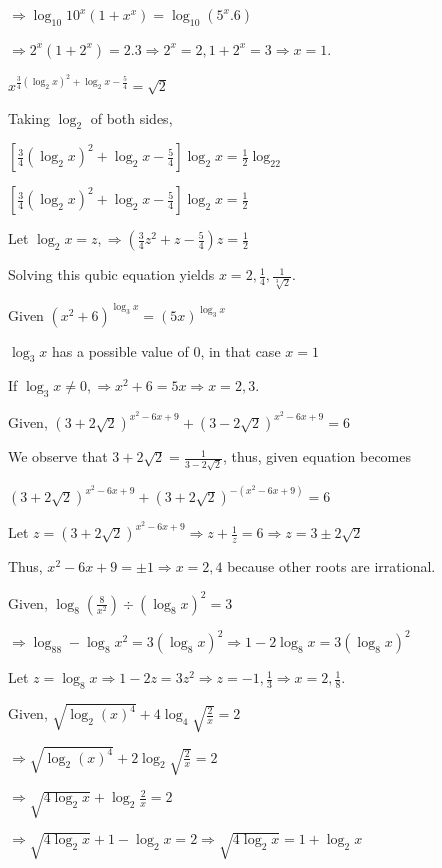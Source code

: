   $\Rightarrow \log_{10}10^x(1 + x^x) = \log_{10}(5^x.6)$

  $\Rightarrow 2^x(1 + 2^x) = 2.3 \Rightarrow 2^x = 2, 1 + 2^x = 3 \Rightarrow x = 1$.
\item $x^{\tfrac{3}{4}(\log_2x)^2 + \log_2x - \tfrac{5}{4}} = \sqrt{2}$

  Taking $\log_2$ of both sides,

  $\left[\frac{3}{4}(\log_2x)^2 + \log_2x - \frac{5}{4}\right]\log_2x = \frac{1}{2}\log_22$

  $\left[\frac{3}{4}(\log_2x)^2 + \log_2x - \frac{5}{4}\right]\log_2x = \frac{1}{2}$

  Let $\log_2x = z, \Rightarrow \left(\frac{3}{4}z^2 + z - \frac{5}{4}\right)z = \frac{1}{2}$

  Solving this qubic equation yields $x = 2, \frac{1}{4}, \frac{1}{\sqrt[3]{2}}$.
\item Given $(x^2 + 6)^{\log_3x} = (5x)^{\log_3x}$

  $\log_3x$ has a possible value of $0$, in that case $x = 1$

  If $\log_3x\neq 0, \Rightarrow x^2 + 6 = 5x \Rightarrow x = 2, 3$.
\item Given, $(3 + 2\sqrt{2})^{x^2 - 6x + 9} + (3 - 2\sqrt{2})^{x^2 - 6x + 9} = 6$

  We observe that $3 + 2\sqrt{2} = \frac{1}{3 - 2\sqrt{2}}$, thus, given equation becomes

  $(3 + 2\sqrt{2})^{x^2 - 6x + 9} + (3 + 2\sqrt{2})^{-(x^2 - 6x + 9)} = 6$

  Let $z = (3 + 2\sqrt{2})^{x^2 - 6x + 9}\Rightarrow z + \frac{1}{z} = 6 \Rightarrow z = 3\pm2\sqrt{2}$

  Thus, $x^2 - 6x + 9 = \pm 1 \Rightarrow x = 2, 4$ because other roots are irrational.
\item Given, $\log_8\left(\frac{8}{x^2}\right)\div(\log_8x)^2 = 3$

  $\Rightarrow \log_88 - \log_8x^2 = 3(\log_8x)^2 \Rightarrow 1 - 2\log_8x = 3(\log_8x)^2$

  Let $z = \log_8x\Rightarrow 1 - 2z = 3z^2 \Rightarrow z = -1, \frac{1}{3}\Rightarrow x = 2, \frac{1}{8}$.
\item Given, $\sqrt{\log_2(x)^4} + 4\log_4\sqrt{\tfrac{2}{x}} = 2$

  $\Rightarrow \sqrt{\log_2(x)^4} + 2\log_2\sqrt{\tfrac{2}{x}} = 2$

  $\Rightarrow \sqrt{4\log_2x} + \log_2\tfrac{2}{x} = 2$

  $\Rightarrow \sqrt{4\log_2x} + 1 - \log_2x = 2 \Rightarrow \sqrt{4\log_2x} = 1 + \log_2x$

